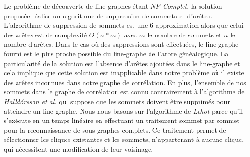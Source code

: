 Le probl\`eme de d\'ecouverte de line-graphes \'etant {\em NP-Complet}, la solution propos\'ee r\'ealise un algorithme de suppression de sommets et d'ar\^etes. 
L'algorithme de suppression de sommets est une 6-approximation alors que celui des ar\^etes est de complexit\'e $O(n*m)$ avec $m$ le nombre de sommets et $n$ le nombre d'ar\^etes.
Dans le cas o\`u des suppressions sont effectu\'ees, le line-graphe fourni est le plus proche possible du line-graphe de l'arbre g\'en\'ealogique.
La particularit\'e de la solution est l'absence d'ar\^etes ajout\'ees dans le line-graphe et cela implique que cette solution est inapplicable dans notre probl\`eme o\`u il existe des ar\^etes inconnues dans notre graphe de corr\'elation. En plus, l'ensemble de nos sommets dans le graphe de corr\'elation est connu contrairement \`a l'algorithme de {\em Halld{\'o}rsson et al.} qui suppose que les sommets doivent \^etre supprim\'es pour atteindre un line-graphe.
\newline
Nous nous basons sur l'algorithme de {\em Lehot} parce qu'il s'ex\'ecute en un temps lin\'eaire en effectuant un traitement sommet par sommet pour la reconnaissance de sous-graphes complets. Ce traitement permet de s\'electionner les cliques existantes et les sommets, n'appartenant \`a aucune clique, qui n\'ecessitent une modification de leur voisinage.